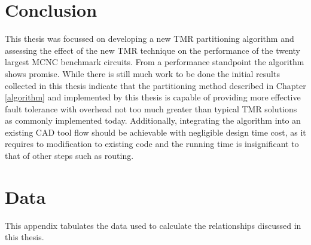 \documentclass[12pt,final,oneside]{dwThesis} %
\begin{document}
   \chapter{Conclusion}
   This thesis was focussed on developing a new TMR
   partitioning algorithm and assessing the effect of the new \gls{TMR}
   technique on the performance of the twenty largest \gls{MCNC} benchmark circuits. From a performance
   standpoint the algorithm shows promise. While there is still much work to be
   done the initial results collected in this thesis indicate that the
   partitioning method described in Chapter \ref{algorithm} and implemented by this
   thesis is capable of providing more effective fault tolerance with overhead
   not too much greater than typical \gls{TMR} solutions as commonly
   implemented today. Additionally, integrating the algorithm into an existing \gls{CAD} tool flow 
   should be achievable with negligible design time cost, as it requires to modification to existing code and
   the running time is insignificant to that of other steps such as routing.


   \appendix 
   \chapter{Data}
   This appendix tabulates the data used to
   calculate the relationships discussed in this thesis.
\end{document}
